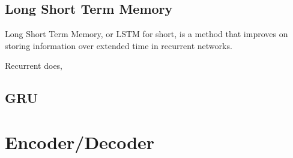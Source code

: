 \subsection{Long Short Term Memory}
Long Short Term Memory, or LSTM for short, is a method that improves on storing information over extended time in recurrent networks. 

Recurrent does, 

\cite{hochreiter1997long}

\subsection{GRU}


\section{Encoder/Decoder}

\cite{rocktaschel2015reasoning}